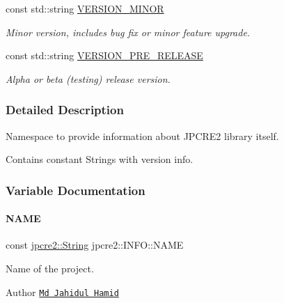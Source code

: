 \begin{DoxyCompactItemize}
\hypertarget{namespacejpcre2_1_1INFO_a0644b3b2680e99fc88c0a98f6a0d25d1}{}\label{namespacejpcre2_1_1INFO_a0644b3b2680e99fc88c0a98f6a0d25d1} 
const std\+::string \hyperlink{namespacejpcre2_1_1INFO_a0644b3b2680e99fc88c0a98f6a0d25d1}{V\+E\+R\+S\+I\+O\+N\+\_\+\+M\+I\+N\+OR}
\begin{DoxyCompactList}\small\item\em Minor version, includes bug fix or minor feature upgrade. \end{DoxyCompactList}\item 
\hypertarget{namespacejpcre2_1_1INFO_a85fb46b46141271d426f53b2c2ba6b15}{}\label{namespacejpcre2_1_1INFO_a85fb46b46141271d426f53b2c2ba6b15} 
const std\+::string \hyperlink{namespacejpcre2_1_1INFO_a85fb46b46141271d426f53b2c2ba6b15}{V\+E\+R\+S\+I\+O\+N\+\_\+\+P\+R\+E\+\_\+\+R\+E\+L\+E\+A\+SE}
\begin{DoxyCompactList}\small\item\em Alpha or beta (testing) release version. \end{DoxyCompactList}\end{DoxyCompactItemize}


\subsubsection{Detailed Description}
Namespace to provide information about J\+P\+C\+R\+E2 library itself. 

Contains constant Strings with version info. 

\subsubsection{Variable Documentation}
\hypertarget{namespacejpcre2_1_1INFO_a0d5716a82b496f2ccf5eee832275b4b8_a0d5716a82b496f2ccf5eee832275b4b8}{}\label{namespacejpcre2_1_1INFO_a0d5716a82b496f2ccf5eee832275b4b8_a0d5716a82b496f2ccf5eee832275b4b8} 
\paragraph{\texorpdfstring{N\+A\+ME}{NAME}}
{\footnotesize\ttfamily const \hyperlink{namespacejpcre2_a91f03070152fb228bc116c5a737f1d16}{jpcre2\+::\+String} jpcre2\+::\+I\+N\+F\+O\+::\+N\+A\+ME}



Name of the project. 

\begin{DoxyAuthor}{Author}
\href{https://github.com/neurobin}{\tt Md Jahidul Hamid} 
\end{DoxyAuthor}
